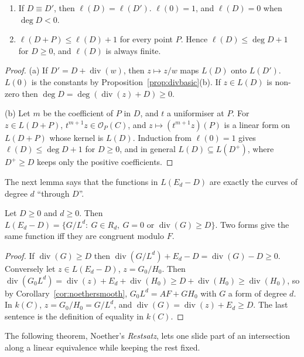 \begin{proposition}\label{prop:ellbasic}
\begin{enumerate}[label=(\alph*)]
\item If $D\equiv D'$, then $\ell(D)=\ell(D')$. $\ell(0)=1$, and $\ell(D)=0$ when $\deg D<0$.
\item $\ell(D+P)\le\ell(D)+1$ for every point $P$. Hence $\ell(D)\le\deg D+1$ for $D\ge0$, and $\ell(D)$ is always finite.
\end{enumerate}
\end{proposition}
\begin{proof}
(a) If $D'=D+\operatorname{div}(w)$, then $z\mapsto z/w$ maps $L(D)$ onto $L(D')$. $L(0)$ is the constants by Proposition~\ref{prop:divbasic}(b). If
$z\in L(D)$ is non-zero then $\deg D=\deg(\operatorname{div}(z)+D)\ge0$.

(b) Let $m$ be the coefficient of $P$ in $D$, and $t$ a uniformiser at $P$. For $z\in L(D+P)$, $t^{m+1}z\in\mathcal O_P(C)$, and $z\mapsto(t^{m+1}z)(P)$ is a linear form
on $L(D+P)$ whose kernel is $L(D)$. Induction from $\ell(0)=1$ gives $\ell(D)\le\deg D+1$ for $D\ge0$, and in general $L(D)\subseteq L(D^+)$, where $D^+\ge D$ keeps
only the positive coefficients.
\end{proof}

The next lemma says that the functions in $L(E_d-D)$ are exactly the curves of degree $d$ ``through $D$''.

\begin{lemma}\label{lem:noetherrep}
Let $D\ge0$ and $d\ge0$. Then $L(E_d-D)=\{G/L^d:\ G\in R_d,\ G=0\text{ or }\operatorname{div}(G)\ge D\}$. Two forms give the same function iff they
are congruent modulo $F$.
\end{lemma}
\begin{proof}
If $\operatorname{div}(G)\ge D$ then $\operatorname{div}(G/L^d)+E_d-D=\operatorname{div}(G)-D\ge0$. Conversely let $z\in L(E_d-D)$, $z=G_0/H_0$. Then
$\operatorname{div}(G_0L^d)=\operatorname{div}(z)+E_d+\operatorname{div}(H_0)\ge D+\operatorname{div}(H_0)\ge\operatorname{div}(H_0)$, so by
Corollary~\ref{cor:noethersmooth}, $G_0L^d=AF+GH_0$ with $G$ a form of degree $d$. In $k(C)$, $z=G_0/H_0=G/L^d$, and
$\operatorname{div}(G)=\operatorname{div}(z)+E_d\ge D$. The last sentence is the definition of equality in $k(C)$.
\end{proof}

The following theorem, Noether's \emph{Restsatz}, lets one slide part of an intersection along a linear equivalence while keeping the rest fixed.

